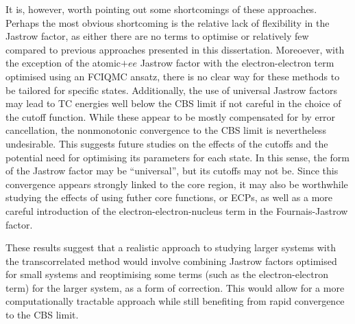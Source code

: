 It is, however, worth pointing out some shortcomings of these approaches. Perhaps the most obvious shortcoming is the relative lack of flexibility in the Jastrow factor, as either there are no terms to optimise or relatively few compared to previous approaches presented in this dissertation. Moreoever, with the exception of the atomic$+ee$ Jastrow factor with the electron-electron term optimised using an FCIQMC ansatz, there is no clear way for these methods to be tailored for specific states. Additionally, the use of universal Jastrow factors may lead to TC energies well below the CBS limit if not careful in the choice of the cutoff function. While these appear to be mostly compensated for by error cancellation, the nonmonotonic convergence to the CBS limit is nevertheless undesirable. This suggests future studies on the effects of the cutoffs and the potential need for optimising its parameters for each state. In this sense, the form of the Jastrow factor may be ``universal'', but its cutoffs may not be. Since this convergence appears strongly linked to the core region, it may also be worthwhile studying the effects of using futher core functions, or \glspl{ECP}, as well as a more careful introduction of the electron-electron-nucleus term in the Fournais-Jastrow factor.

These results suggest that a realistic approach to studying larger systems with the transcorrelated method would involve combining Jastrow factors optimised for small systems and reoptimising some terms (such as the electron-electron term) for the larger system, as a form of correction. This would allow for a more computationally tractable approach while still benefiting from rapid convergence to the CBS limit.
